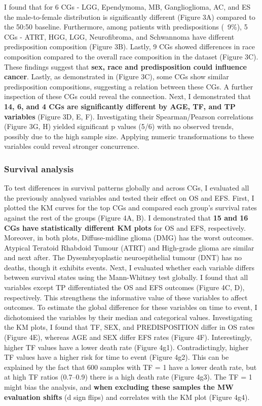\documentclass[a4paper,11pt]{article}
\begin{document}
I found that for 6 CGs - LGG, Ependymoma, MB, Ganglioglioma, AC, and ES the male-to-female distribution is significantly different (Figure 3A) compared to the 50:50 baseline.
Furthermore, among patients with predispositions (~9\%), 5 CGs - ATRT, HGG, LGG, Neurofibroma, and Schwannoma have different predisposition composition (Figure 3B).
Lastly, 9 CGs showed differences in race composition compared to the overall race composition in the dataset (Figure 3C).
These findings suggest that \textbf{sex, race and predisposition could influence cancer}. Lastly, as demonstrated in 
(Figure 3C), some CGs show similar predisposition compositions, suggesting a relation between these CGs. 
A further inspection of these CGs could reveal the connection. Next, I demonstrated that \textbf{14, 6, and 4 CGs are significantly different by AGE, TF, and TP variables} (Figure 3D, E, F). Investigating their Spearman/Pearson correlations (Figure 3G, H)
yielded significant p values (5/6) with no observed trends, possibly due to the high sample size. Applying numeric transformations to these
variables could reveal stronger concurrence.

\subsubsection{Survival analysis}
To test differences in survival patterns globally and across CGs, I evaluated all the previously analysed variables and tested their
effect on OS and EFS. First, I plotted the KM curves for the top CGs and compared each group's survival rates against the rest of the
groups (Figure 4A, B). I demonstrated that \textbf{15 and 16 CGs have statistically different KM plots} for OS and EFS, respectively.
Moreover, in both plots, Diffuse-midline glioma (DMG) has the worst outcomes. Atypical Teratoid Rhabdoid Tumour (ATRT) and High-grade glioma
are similar and next after. The Dysembryoplastic neuroepithelial tumour (DNT) has no deaths, though it exhibits events.
Next, I evaluated whether each variable differs between survival states using the Mann-Whitney test globally. 
I found that all variables except TP differentiated the OS and EFS outcomes (Figure 4C, D), respectively. This strengthens 
the informative value of these variables to affect outcomes. 
To estimate the global difference for these variables on time to event, I dichotomised the variables by their median and categorical values. Investigating the KM plots, I found that TF, SEX, and PREDISPOSITION differ in OS rates (Figure 4E), whereas 
AGE and SEX differ EFS rates (Figure 4F). Interestingly, higher TF values have a lower death rate (Figure 4g1). Contradictingly, 
higher TF values have a higher risk for time to event (Figure 4g2). This can be explained by the fact that 600 samples with TF = 1 
have a lower death rate, but at high TF ratios (0.7--0.9) there is a high death rate (Figure 4g3). The TF = 1 might bias the analysis, 
and \textbf{when excluding these samples the MW evaluation shifts} (d sign flips) and correlates with the KM plot (Figure 4g4).
\end{document}
